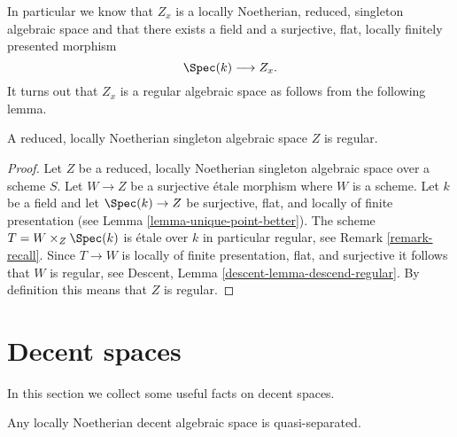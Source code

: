 \noindent
In particular we know that $Z_x$ is a
locally Noetherian, reduced, singleton algebraic space
and that there exists a field and a surjective, flat, locally
finitely presented morphism
$$
\Spec(k) \longrightarrow Z_x.
$$
It turns out that $Z_x$
is a regular algebraic space as follows from the following lemma.

\begin{lemma}
\label{lemma-residual-space-regular}
A reduced, locally Noetherian singleton algebraic space $Z$ is regular.
\end{lemma}

\begin{proof}
Let $Z$ be a reduced, locally Noetherian singleton algebraic space
over a scheme $S$. Let $W \to Z$ be a surjective \'etale morphism where $W$
is a scheme. Let $k$ be a field and let $\Spec(k) \to Z$
be surjective, flat, and locally of finite presentation (see
Lemma \ref{lemma-unique-point-better}).
The scheme $T = W \times_Z \Spec(k)$ is
\'etale over $k$ in particular regular, see
Remark \ref{remark-recall}.
Since $T \to W$ is locally of finite presentation, flat, and surjective it
follows that $W$ is regular, see
Descent, Lemma \ref{descent-lemma-descend-regular}.
By definition this means that $Z$ is regular.
\end{proof}











\section{Decent spaces}
\label{section-decent}

\noindent
In this section we collect some useful facts on decent spaces.

\begin{lemma}
\label{lemma-locally-Noetherian-decent-quasi-separated}
Any locally Noetherian decent algebraic space is quasi-separated.
\end{lemma}

